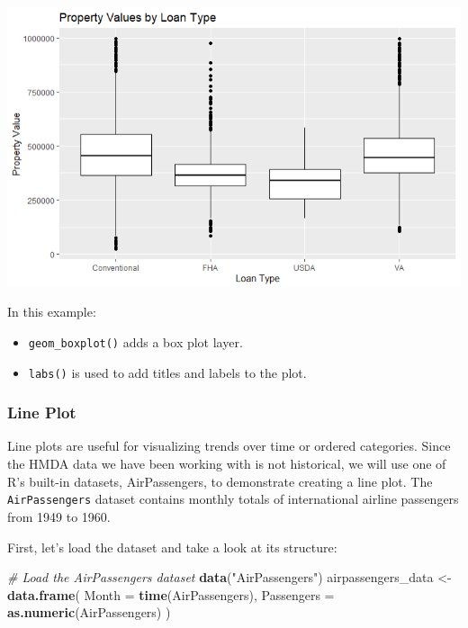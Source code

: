 \documentclass[
]{book}
\newenvironment{Shaded}{\begin{snugshade}}{\end{snugshade}}
\newcommand{\AttributeTok}[1]{\textcolor[rgb]{0.13,0.29,0.53}{#1}}
\newcommand{\CommentTok}[1]{\textcolor[rgb]{0.56,0.35,0.01}{\textit{#1}}}
\newcommand{\FunctionTok}[1]{\textcolor[rgb]{0.13,0.29,0.53}{\textbf{#1}}}
\newcommand{\NormalTok}[1]{#1}
\newcommand{\OtherTok}[1]{\textcolor[rgb]{0.56,0.35,0.01}{#1}}
\newcommand{\StringTok}[1]{\textcolor[rgb]{0.31,0.60,0.02}{#1}}
\begin{document}
\includegraphics{images/box_plot.PNG}

In this example:

\begin{itemize}
\item
  \texttt{geom\_boxplot()} adds a box plot layer.
\item
  \texttt{labs()} is used to add titles and labels to the plot.
\end{itemize}

\hypertarget{line-plot}{%
\subsubsection*{Line Plot}\label{line-plot}}

Line plots are useful for visualizing trends over time or ordered categories. Since the HMDA data we have been working with is not historical, we will use one of R's built-in datasets, AirPassengers, to demonstrate creating a line plot. The \texttt{AirPassengers} dataset contains monthly totals of international airline passengers from 1949 to 1960.

First, let's load the dataset and take a look at its structure:

\begin{Shaded}
\begin{Highlighting}[]
\CommentTok{\# Load the AirPassengers dataset}
\FunctionTok{data}\NormalTok{(}\StringTok{"AirPassengers"}\NormalTok{)}
\NormalTok{airpassengers\_data }\OtherTok{\textless{}{-}} \FunctionTok{data.frame}\NormalTok{(}
  \AttributeTok{Month =} \FunctionTok{time}\NormalTok{(AirPassengers),}
  \AttributeTok{Passengers =} \FunctionTok{as.numeric}\NormalTok{(AirPassengers)}
\NormalTok{)}
\end{Highlighting}
\end{Shaded}
\end{document}

